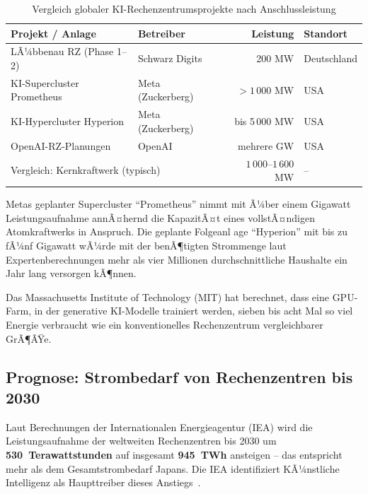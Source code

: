 ﻿\documentclass[12pt, a4paper, openany]{report}
\begin{document}
\begin{table}[H]
	\centering
	\caption{Vergleich globaler KI-Rechenzentrumsprojekte nach Anschlussleistung}
	\label{tab:leistungsvergleich}
	\begin{tabularx}{0.88\textwidth}{l l r l}
		\toprule
		\textbf{Projekt / Anlage} & \textbf{Betreiber} & \textbf{Leistung} & \textbf{Standort} \\
		\midrule
		LÃ¼bbenau RZ (Phase 1--2)  & Schwarz Digits & 200 MW  & Deutschland \\
		KI-Supercluster Prometheus & Meta (Zuckerberg) & $> 1\,000$ MW  & USA \\
		KI-Hypercluster Hyperion   & Meta (Zuckerberg) & bis 5\,000 MW   & USA \\
		OpenAI-RZ-Planungen        & OpenAI & mehrere GW   & USA \\
		\midrule
		\multicolumn{2}{l}{Vergleich: Kernkraftwerk (typisch)} & $1\,000$--$1\,600$ MW & -- \\
		\bottomrule
	\end{tabularx}
\end{table}

\noindent
Metas geplanter Supercluster ``Prometheus'' nimmt mit Ã¼ber einem Gigawatt
Leistungsaufnahme annÃ¤hernd die KapazitÃ¤t eines vollstÃ¤ndigen Atomkraftwerks
in Anspruch. Die geplante Folgeanl age ``Hyperion'' mit bis zu fÃ¼nf Gigawatt
wÃ¼rde mit der benÃ¶tigten Strommenge laut Expertenberechnungen mehr als vier
Millionen durchschnittliche Haushalte ein Jahr lang versorgen kÃ¶nnen.

Das Massachusetts Institute of Technology (MIT) hat berechnet, dass eine
GPU-Farm, in der generative KI-Modelle trainiert werden, sieben bis acht
Mal so viel Energie verbraucht wie ein konventionelles Rechenzentrum
vergleichbarer GrÃ¶ÃŸe.

\subsection{Prognose: Strombedarf von Rechenzentren bis 2030}

Laut Berechnungen der Internationalen Energieagentur (IEA) wird die
Leistungsaufnahme der weltweiten Rechenzentren bis 2030 um
\textbf{530~Terawattstunden} auf insgesamt \textbf{945~TWh} ansteigen --
das entspricht mehr als dem Gesamtstrombedarf Japans. Die IEA identifiziert
KÃ¼nstliche Intelligenz als Haupttreiber dieses Anstiegs~\cite{iea2024}.
\end{document}
